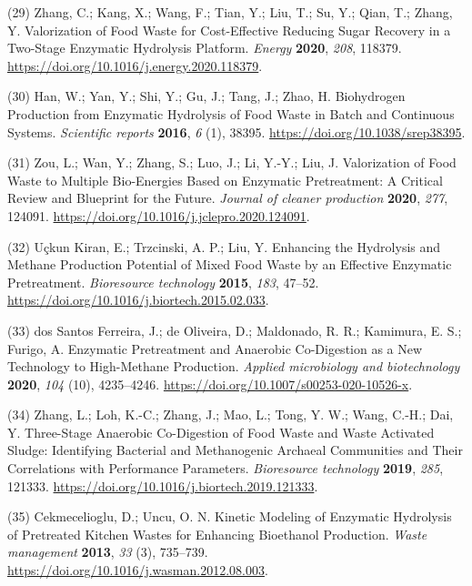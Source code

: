 \documentclass[11pt]{report}
\begin{document}
\hypertarget{citeproc_bib_item_29}{(29) Zhang, C.; Kang, X.; Wang, F.; Tian, Y.; Liu, T.; Su, Y.; Qian, T.; Zhang, Y. Valorization of Food Waste for Cost-Effective Reducing Sugar Recovery in a Two-Stage Enzymatic Hydrolysis Platform. \textit{Energy} \textbf{2020}, \textit{208}, 118379. \url{https://doi.org/10.1016/j.energy.2020.118379}.}

\hypertarget{citeproc_bib_item_30}{(30) Han, W.; Yan, Y.; Shi, Y.; Gu, J.; Tang, J.; Zhao, H. Biohydrogen Production from Enzymatic Hydrolysis of Food Waste in Batch and Continuous Systems. \textit{Scientific reports} \textbf{2016}, \textit{6} (1), 38395. \url{https://doi.org/10.1038/srep38395}.}

\hypertarget{citeproc_bib_item_31}{(31) Zou, L.; Wan, Y.; Zhang, S.; Luo, J.; Li, Y.-Y.; Liu, J. Valorization of Food Waste to Multiple Bio-Energies Based on Enzymatic Pretreatment: A Critical Review and Blueprint for the Future. \textit{Journal of cleaner production} \textbf{2020}, \textit{277}, 124091. \url{https://doi.org/10.1016/j.jclepro.2020.124091}.}

\hypertarget{citeproc_bib_item_32}{(32) Uçkun Kiran, E.; Trzcinski, A. P.; Liu, Y. Enhancing the Hydrolysis and Methane Production Potential of Mixed Food Waste by an Effective Enzymatic Pretreatment. \textit{Bioresource technology} \textbf{2015}, \textit{183}, 47–52. \url{https://doi.org/10.1016/j.biortech.2015.02.033}.}

\hypertarget{citeproc_bib_item_33}{(33) dos Santos Ferreira, J.; de Oliveira, D.; Maldonado, R. R.; Kamimura, E. S.; Furigo, A. Enzymatic Pretreatment and Anaerobic Co-Digestion as a New Technology to High-Methane Production. \textit{Applied microbiology and biotechnology} \textbf{2020}, \textit{104} (10), 4235–4246. \url{https://doi.org/10.1007/s00253-020-10526-x}.}

\hypertarget{citeproc_bib_item_34}{(34) Zhang, L.; Loh, K.-C.; Zhang, J.; Mao, L.; Tong, Y. W.; Wang, C.-H.; Dai, Y. Three-Stage Anaerobic Co-Digestion of Food Waste and Waste Activated Sludge: Identifying Bacterial and Methanogenic Archaeal Communities and Their Correlations with Performance Parameters. \textit{Bioresource technology} \textbf{2019}, \textit{285}, 121333. \url{https://doi.org/10.1016/j.biortech.2019.121333}.}

\hypertarget{citeproc_bib_item_35}{(35) Cekmecelioglu, D.; Uncu, O. N. Kinetic Modeling of Enzymatic Hydrolysis of Pretreated Kitchen Wastes for Enhancing Bioethanol Production. \textit{Waste management} \textbf{2013}, \textit{33} (3), 735–739. \url{https://doi.org/10.1016/j.wasman.2012.08.003}.}
\end{document}
